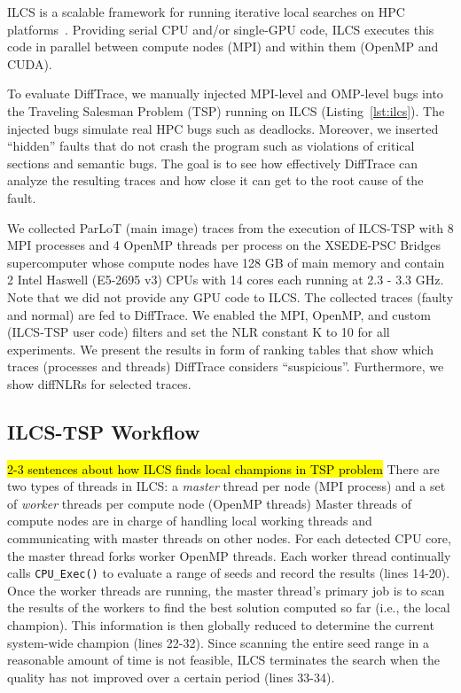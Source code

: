 ILCS is a scalable framework for running iterative local searches on HPC platforms~\cite{ilcs}.
%
Providing serial CPU and/or single-GPU code, ILCS executes this code in parallel between compute nodes (MPI) and within them (OpenMP and CUDA).
%

To evaluate DiffTrace, we manually injected MPI-level and OMP-level bugs into the Traveling Salesman Problem (TSP) running on ILCS (Listing~\ref{lst:ilcs}).
%
The injected bugs simulate real HPC bugs such as deadlocks.
%
%
Moreover, we inserted ``hidden'' faults that do not crash the program such as violations of critical sections and semantic bugs. 
%
%
The goal is to see how effectively DiffTrace can analyze the resulting traces and how close it can get to the root cause of the fault.
%


%
We collected ParLoT (main image) traces from the execution of ILCS-TSP with 8 MPI processes and 4 OpenMP threads per process on the XSEDE-PSC Bridges supercomputer whose compute nodes have 128 GB of main memory and contain 2 Intel Haswell (E5-2695 v3) CPUs with 14 cores each running at 2.3 - 3.3 GHz.
%
Note that we did not provide any GPU code to ILCS.
%
The collected traces (faulty and normal) are fed to DiffTrace. We enabled the MPI, OpenMP, and custom (ILCS-TSP user code) filters and set the NLR constant K to 10 for all experiments.
%
We present the results in form of ranking tables that show which traces (processes and threads) DiffTrace considers ``suspicious''. Furthermore, we show diffNLRs for selected traces.

\subsection{ILCS-TSP Workflow}

\hl{2-3 sentences about how ILCS finds local champions in TSP problem}
There are two types of threads in ILCS: a \textit{master} thread per node (MPI process) and a set of \textit{worker} threads per compute node (OpenMP threads)
%
Master threads of compute nodes are in charge of handling local working threads and communicating with master threads on other nodes.
%
For each detected CPU core, the master thread forks worker OpenMP threads.
%
Each worker thread continually calls
\texttt{CPU\_Exec()} to evaluate a range of seeds and record the results (lines 14-20).
%
Once the worker threads are running, the master thread's primary job is to scan the results of the workers to find the best solution computed so far (i.e., the local champion). This information is then globally reduced to determine the current system-wide champion (lines 22-32).
%
Since scanning the entire seed range in a reasonable amount of time is not feasible, ILCS terminates the search when the quality has not improved over a certain period (lines 33-34).

